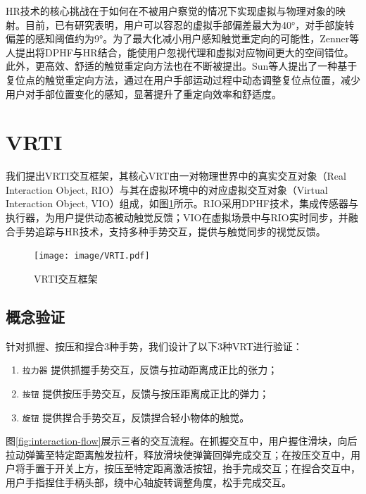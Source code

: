 \documentclass[runningheads]{llncs}
\begin{document}
HR技术的核心挑战在于如何在不被用户察觉的情况下实现虚拟与物理对象的映射。目前，已有研究表明，用户可以容忍的虚拟手部偏差最大为40°\cite{10.1145/3025453.3025753}，对手部旋转偏差的感知阈值约为9°\cite{zenner2019estimating}。为了最大化减小用户感知触觉重定向的可能性，Zenner等人提出将DPHF与HR结合，能使用户忽视代理和虚拟对应物间更大的空间错位。此外，更高效、舒适的触觉重定向方法也在不断被提出。Sun等人提出了一种基于复位点的触觉重定向方法，通过在用户手部运动过程中动态调整复位点位置，减少用户对手部位置变化的感知，显著提升了重定向效率和舒适度\cite{10816517}。

\section{VRTI}
我们提出VRTI交互框架，其核心VRT由一对物理世界中的真实交互对象（Real Interaction Object, RIO）与其在虚拟环境中的对应虚拟交互对象（Virtual Interaction Object, VIO）组成，如图\ref{fig:VRTI}所示。RIO采用DPHF技术，集成传感器与执行器，为用户提供动态被动触觉反馈；VIO在虚拟场景中与RIO实时同步，并融合手势追踪与HR技术，支持多种手势交互，提供与触觉同步的视觉反馈。

\begin{figure}[t]
  \centering
  \texttt{[image: image/VRTI.pdf]}
  \caption{VRTI交互框架}
  \label{fig:VRTI}
\end{figure}

\subsection{概念验证}
针对抓握、按压和捏合3种手势，我们设计了以下3种VRT进行验证：

\begin{enumerate}[label={\arabic*)}]
  \item \texttt{拉力器} 提供抓握手势交互，反馈与拉动距离成正比的张力；
  \item \texttt{按钮} 提供按压手势交互，反馈与按压距离成正比的弹力；
  \item \texttt{旋钮} 提供捏合手势交互，反馈捏合轻小物体的触觉。
\end{enumerate}

图\ref{fig:interaction-flow}展示三者的交互流程。在抓握交互中，用户握住滑块，向后拉动弹簧至特定距离触发拉杆，释放滑块使弹簧回弹完成交互；在按压交互中，用户将手置于开关上方，按压至特定距离激活按钮，抬手完成交互；在捏合交互中，用户手指捏住手柄头部，绕中心轴旋转调整角度，松手完成交互。
\end{document}
